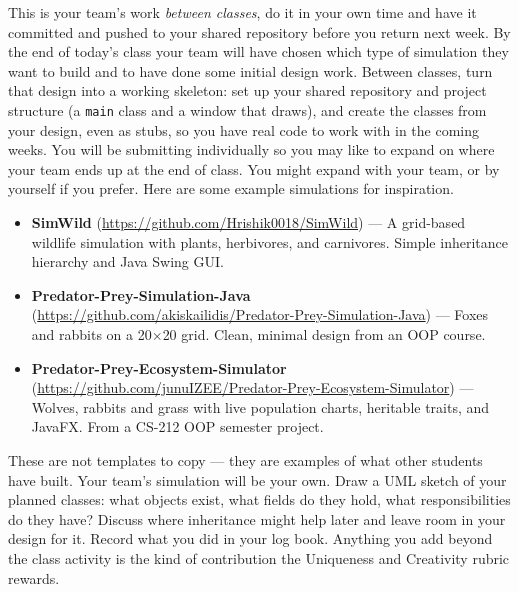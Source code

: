 \documentclass[twoside=false,DIV=14]{scrartcl}
\begin{document}
This is your team's work \emph{between classes}, do it in your own time and have it committed and pushed to your shared repository before you return next week.  By the end of today's class your team will have chosen which type of simulation they want to build and to have done some initial design work.  Between classes, turn that design into a working skeleton: set up your shared repository and project structure (a \texttt{main} class and a window that draws), and create the classes from your design, even as stubs, so you have real code to work with in the coming weeks.  You will be submitting individually so you may like to expand on where your team ends up at the end of class.  You might expand with your team, or by yourself if you prefer.  Here are some example simulations for inspiration.
\begin{itemize}
\item \textbf{SimWild} (\url{https://github.com/Hrishik0018/SimWild}) --- A grid-based wildlife simulation with plants, herbivores, and carnivores.  Simple inheritance hierarchy and Java Swing GUI.
\item \textbf{Predator-Prey-Simulation-Java} (\url{https://github.com/akiskailidis/Predator-Prey-Simulation-Java}) --- Foxes and rabbits on a 20$\times$20 grid.  Clean, minimal design from an OOP course.
\item \textbf{Predator-Prey-Ecosystem-Simulator} (\url{https://github.com/junuIZEE/Predator-Prey-Ecosystem-Simulator}) --- Wolves, rabbits and grass with live population charts, heritable traits, and JavaFX.  From a CS-212 OOP semester project.
\end{itemize}

These are not templates to copy --- they are examples of what other students have built.  Your team's simulation will be your own.  Draw a UML sketch of your planned classes: what objects exist, what fields do they hold, what responsibilities do they have?  Discuss where inheritance might help later and leave room in your design for it.  Record what you did in your log book.  Anything you add beyond the class activity is the kind of contribution the Uniqueness and Creativity rubric rewards.
\end{document}
